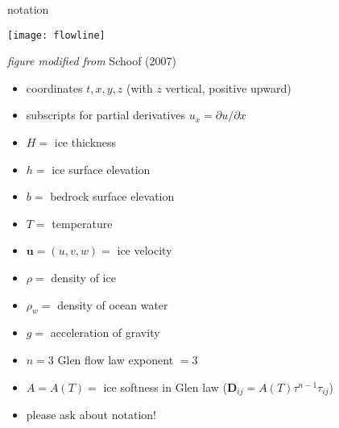 \begin{comment}
\begin{frame}{outside of scope}

\large\emph{not} \normalsize covered here:\normalsize
\medskip

  \begin{itemize}
  \item Stokes and ``higher order'' flow equations
  \item thermomechanical coupling or polythermal ice
  \item subglacial hydrology/processes
  \item mass balance and snow/firn processes
  \item constitutive relations other than Glen isotropic
  \item grounding lines, calving fronts, ocean interaction
  \item paleo-climate and ``spin-up''
  \item earth deformation under ice sheet load
  \item other numerics: FEM, spectral, multigrid, parallel, \dots
  \item etc.
  \end{itemize}

\end{frame}
\end{comment}

\begin{frame}{notation} 

\begin{center}
  \texttt{[image: flowline]}

\tiny \emph{figure modified from} Schoof (2007)
\end{center}

\scriptsize
  \begin{itemize}
  \item coordinates $t,x,y,z$  (with $z$ vertical, positive upward)
  \item subscripts for partial derivatives $u_x = \partial u/\partial x$
  \item $H=$ ice thickness
  \item $h=$ ice surface elevation
  \item $b=$ bedrock surface elevation
  \item $T=$ temperature
  \item $\mathbf{u}=(u,v,w)=$ ice velocity
  \item $\rho=$ density of ice
  \item $\rho_w=$ density of ocean water
  \item $g=$ acceleration of gravity
  \item $n=3$ Glen flow law exponent $=3$
  \item $A=A(T)=$ ice softness in Glen law ($\mathbf{D}_{ij} = A(T) \tau^{n-1} \tau_{ij}$)
  \item \alert{please ask about notation!}
  \end{itemize}

\end{frame}


